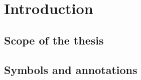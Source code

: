 \chapter{Introduction}
\section{Scope of the thesis}

\newpage
\section{Symbols and annotations}
\glsaddall
\printglossaries